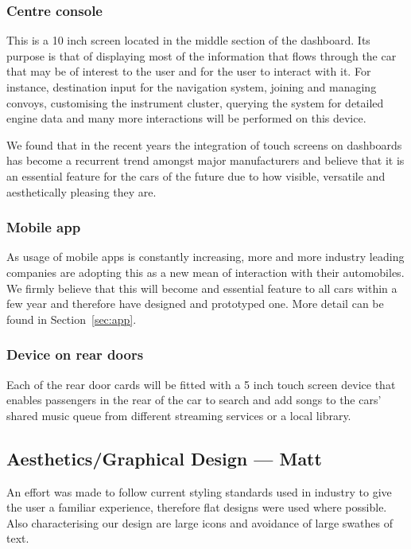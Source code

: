 \documentclass{article}
\begin{document}
\subsubsection{Centre console}\label{sssec:centre-console}
This is a 10 inch screen located in the middle section of the dashboard. Its purpose is that of displaying most of the information that flows through the car that may be of interest to the user and for the user to interact with it. For instance, destination input for the navigation system, joining and managing convoys, customising the instrument cluster, querying the system for detailed engine data and many more interactions will be performed on this device.

We found that in the recent years the integration of touch screens on dashboards has become a recurrent trend amongst major manufacturers and believe that it is an essential feature for the cars of the future due to how visible, versatile and aesthetically pleasing they are.

\subsubsection{Mobile app}\label{sssec:mobile-app}
As usage of mobile apps is constantly increasing, more and more industry leading companies are adopting this as a new mean of interaction with their automobiles. We firmly believe that this will become and essential feature to all cars within a few year and therefore have designed and prototyped one. More detail can be found in Section~\ref{sec:app}.

\subsubsection{Device on rear doors}\label{sssec:device-rear-doors}
Each of the rear door cards will be fitted with a 5 inch touch screen device that enables passengers in the rear of the car to search and add songs to the cars' shared music queue from different streaming services or a local library.

\subsection{Aesthetics/Graphical Design --- Matt}\label{ssec:aesthetics}
An effort was made to follow current styling standards used in industry to give the user a familiar experience, therefore flat designs were used where possible. Also characterising our design are large icons and avoidance of large swathes of text.
\end{document}
